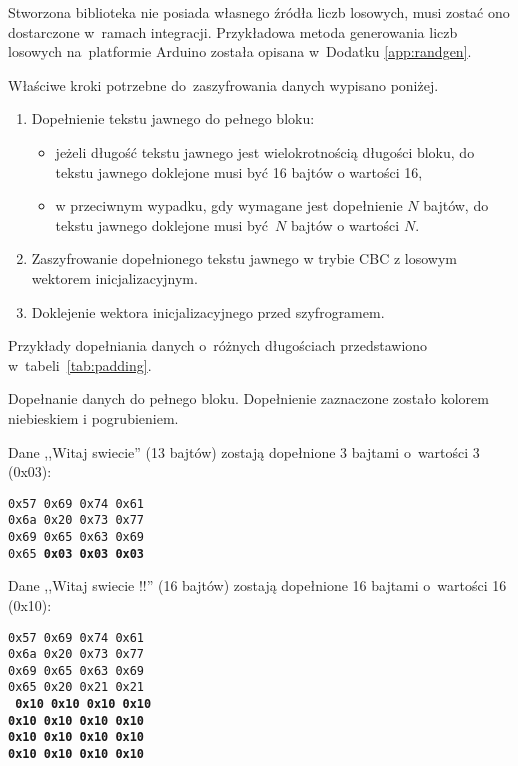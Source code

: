 Stworzona biblioteka nie posiada własnego źródła liczb losowych, musi zostać ono dostarczone w~ramach integracji. Przykładowa metoda generowania liczb losowych na~platformie Arduino została opisana w~Dodatku \ref{app:randgen}.

Właściwe kroki potrzebne do~zaszyfrowania danych wypisano poniżej.

\begin{enumerate}
\item Dopełnienie tekstu jawnego do pełnego bloku:
\begin{itemize}
\item jeżeli długość tekstu jawnego jest wielokrotnością długości bloku, do tekstu jawnego doklejone musi być 16 bajtów o wartości 16,
\item w przeciwnym wypadku, gdy wymagane jest dopełnienie $ N $ bajtów, do tekstu jawnego doklejone musi być $ N $ bajtów o wartości $ N $.
\end{itemize}
\item Zaszyfrowanie dopełnionego tekstu jawnego w trybie CBC z losowym wektorem inicjalizacyjnym.
\item Doklejenie wektora inicjalizacyjnego przed szyfrogramem.
\end{enumerate}

Przykłady dopełniania danych o~różnych długościach przedstawiono w~tabeli~\ref{tab:padding}.

\begin{table}[th]
\centering
\caption{Dopełnanie danych do pełnego bloku. Dopełnienie zaznaczone zostało kolorem niebieskiem i pogrubieniem.}
{\footnotesize Dane ,,Witaj swiecie'' (13 bajtów) zostają dopełnione 3 bajtami o~wartości 3 (0x03):}

\texttt{0x57 0x69 0x74 0x61\\
0x6a 0x20 0x73 0x77\\
0x69 0x65 0x63 0x69\\
0x65 {\color[rgb]{0,0,1}\bfseries 0x03 0x03 0x03}}

{\footnotesize Dane ,,Witaj swiecie !!'' (16 bajtów) zostają dopełnione 16 bajtami o~wartości 16 (0x10):}

\texttt{0x57 0x69 0x74 0x61\\
0x6a 0x20 0x73 0x77\\
0x69 0x65 0x63 0x69\\
0x65 0x20 0x21 0x21\\
{\color[rgb]{0,0,1}\bfseries
0x10 0x10 0x10 0x10\\
0x10 0x10 0x10 0x10\\
0x10 0x10 0x10 0x10\\
0x10 0x10 0x10 0x10\\
}
}

\label{tab:padding}
\end{table}

